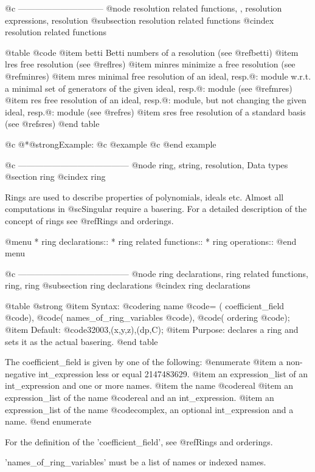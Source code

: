 {{{{{{@c ------------------------------
@node resolution related functions,  , resolution expressions, resolution
@subsection resolution related functions
@cindex resolution related functions

@table @code
@item betti
Betti numbers of a resolution (see @ref{betti})
@item lres
free resolution (see @ref{lres})
@item minres
minimize a free resolution (see @ref{minres})
@item mres
minimal free resolution of an ideal, resp.@: module w.r.t. a minimal set of generators of
the given ideal, resp.@: module (see @ref{mres})
@item res
free resolution of an ideal, resp.@: module, but not changing the
given ideal, resp.@: module (see @ref{res})
@item sres
free resolution of a standard basis (see @ref{sres})
@end table

@c @*@strong{Example:}
@c @example
@c @end example

@c ---------------------------------------
@node ring, string, resolution, Data types
@section ring
@cindex ring

Rings are used to describe properties of polynomials, ideals etc.
Almost all computations in @sc{Singular} require a basering.
For a detailed description of the concept of rings see
@ref{Rings and orderings}.

@menu
* ring declarations::
* ring related functions::
* ring operations::
@end menu

@c ---------------------------------------
@node ring declarations, ring related functions, ring, ring
@subsection ring declarations
@cindex ring declarations

@table @strong
@item Syntax:
@code{ring} name @code{= (} coefficient_field @code{),}
  @code{(} names_of_ring_variables @code{),}
  @code{(} ordering @code{);}
@item Default:
@code{32003,(x,y,z),(dp,C);}
@item Purpose:
declares a ring and sets it as the actual basering.
@end table

The coefficient_field is given by one of the following:
@enumerate
@item
a non-negative int_expression less or equal 2147483629.
@item
an expression_list of an int_expression and one or more names.
@item
the name @code{real}
@item
an expression_list of the name @code{real} and an  int_expression.
@item
an expression_list of the name @code{complex}, an optional int_expression
and a name.
@end enumerate

For the definition of the 'coefficient_field', see @ref{Rings and orderings}.

'names_of_ring_variables' must be a list of names or indexed names.

}}}}}}
